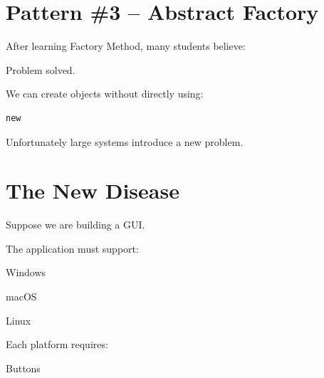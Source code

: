 \documentclass[11pt,a4paper]{book}
\begin{document}
\section{Pattern \#3 -- Abstract Factory}

After learning Factory Method,
many students believe:


Problem solved.


We can create objects without
directly using:

\begin{verbatim}
new
\end{verbatim}


Unfortunately large systems
introduce a new problem.


\section{The New Disease}

Suppose we are building a GUI.


The application must support:


Windows


macOS


Linux


Each platform requires:


Buttons

\end{document}
